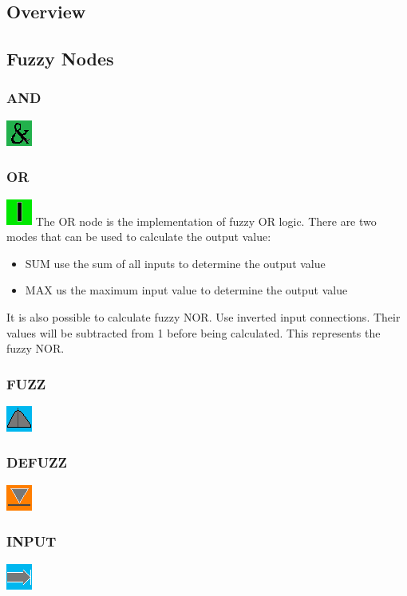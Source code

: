 \documentclass{scrartcl}
\begin{document}
\subsection{Overview}
\subsection{Fuzzy Nodes}
\subsubsection{AND}
\includegraphics{../gui/pics/editor_logo_and.png}
\subsubsection{OR}
\includegraphics{../gui/pics/editor_logo_or.png}
The OR node is the implementation of fuzzy OR logic. There are two modes that can be used to calculate the output value:
\begin{itemize}
\item SUM use the sum of all inputs to determine the output value
\item MAX us the maximum input value to determine the output value
\end{itemize}
It is also possible to calculate fuzzy NOR. Use inverted input connections. Their values will be subtracted from 1 before being calculated. This represents the fuzzy NOR.
\subsubsection{FUZZ}
\includegraphics{../gui/pics/editor_logo_fuzz.png}
\subsubsection{DEFUZZ}
\includegraphics{../gui/pics/editor_logo_defuzz.png}
\subsubsection{INPUT}
\includegraphics{../gui/pics/editor_logo_input.png}
\end{document}
